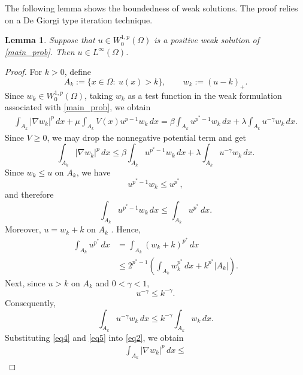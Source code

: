 \documentclass[12pt]{extarticle}
\newtheorem{lemma}[theorem]{Lemma}
\theoremstyle{definition}
\theoremstyle{remark}
\theoremstyle{definition}
\numberwithin{equation}{section}
\numberwithin{equation}{section}
\begin{document}
The following lemma shows the boundedness of weak solutions. The proof relies on a De Giorgi type iteration technique.
		
		
		\begin{lemma}\label{lem3.2}
			Suppose that $u\in W_0^{1,p}(\Omega)$ is a positive weak solution of \eqref{main_prob}. Then $u\in L^\infty(\Omega)$.
		\end{lemma}
		
		\begin{proof}
			For $k>0$, define
			\[
			A_k:=\{x\in\Omega:\ u(x)>k\},
			\qquad
			w_k:=(u-k)_+.
			\]			
			Since $w_k\in W_0^{1,p}(\Omega)$, taking $w_k$ as a test function in the
			weak formulation associated with \eqref{main_prob}, we obtain			
			\begin{align}
				\int_{A_k} |\nabla w_k|^p\,dx
				+
				\mu\int_{A_k}V(x)u^{p-1}w_k\,dx
				=
				\beta\int_{A_k}u^{p^*-1}w_k\,dx
				+
				\lambda\int_{A_k}u^{-\gamma}w_k\,dx .
				\label{eq1}
			\end{align}			
			Since $V\ge0$, we may drop the nonnegative potential term and get			
			\begin{equation}
				\int_{A_k} |\nabla w_k|^p\,dx
				\le
				\beta\int_{A_k}u^{p^*-1}w_k\,dx
				+
				\lambda\int_{A_k}u^{-\gamma}w_k\,dx .
				\label{eq2}
			\end{equation}			
			Since $w_k\le u$ on $A_k$, we have		
			\[
			u^{p^*-1}w_k
			\le
			u^{p^*},
			\]			
			and therefore			
			\begin{equation}
				\int_{A_k}u^{p^*-1}w_k\,dx
				\le
				\int_{A_k}u^{p^*}\,dx .
				\label{eq3}
			\end{equation}			
			Moreover, $u=w_k+k$ on $A_k$ . Hence, 		
			\begin{align}
				\int_{A_k}u^{p^*}\,dx
				&=
				\int_{A_k}(w_k+k)^{p^*}\,dx
				\nonumber\\
				&\le
				2^{p^*-1}
				\left(
				\int_{A_k}w_k^{p^*}\,dx
				+
				k^{p^*}|A_k|
				\right).
				\label{eq4}
			\end{align}			
			Next, since $u>k$ on $A_k$ and $0<\gamma<1$,			
			\[
			u^{-\gamma}
			\le
			k^{-\gamma}.
			\]			
			Consequently,			
			\begin{equation}
				\int_{A_k}u^{-\gamma}w_k\,dx
				\le
				k^{-\gamma}
				\int_{A_k}w_k\,dx .
				\label{eq5}
			\end{equation}			
			Substituting \eqref{eq4} and \eqref{eq5} into \eqref{eq2}, we obtain			
			\begin{align}
				\int_{A_k} |\nabla w_k|^p\,dx
				\le

\end{align}
\end{proof}
\end{document}
